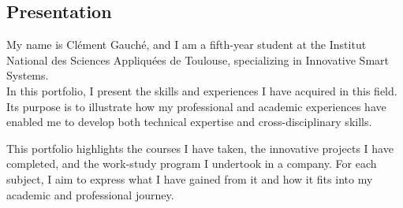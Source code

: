 

\subsection*{Presentation}
My name is Clément Gauché, and I am a fifth-year student at the Institut National des Sciences Appliquées de Toulouse, specializing in Innovative Smart Systems.\\
In this portfolio, I present the skills and experiences I have acquired in this field. Its purpose is to illustrate how my professional and academic experiences have enabled me to develop both technical expertise and cross-disciplinary skills.

This portfolio highlights the courses I have taken, the innovative projects I have completed, and the work-study program I undertook in a company. For each subject, I aim to express what I have gained from it and how it fits into my academic and professional journey.

